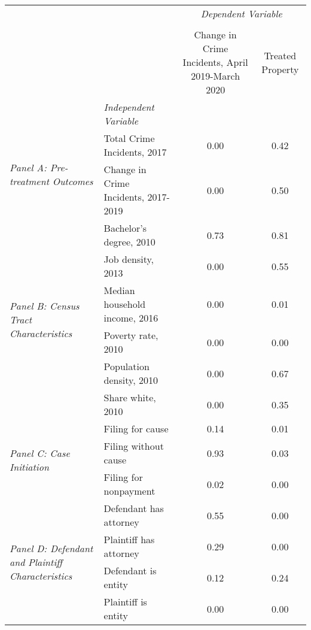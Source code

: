 \begin{tabular}{llcc}
\toprule
 &  & \multicolumn{2}{c}{\textit{Dependent Variable}} \\
\cline{3-4}
\\
 &  & Change in Crime Incidents, April 2019-March 2020 & Treated Property \\
 & \emph{Independent Variable} &  &  \\
\midrule
\multirow[c]{2}{3cm}{\textit{Panel A: Pre-treatment Outcomes}} & Total Crime Incidents, 2017 & 0.00 & 0.42 \\
 & Change in Crime Incidents, 2017-2019 & 0.00 & 0.50 \\
\cline{1-4}
\multirow[c]{6}{3cm}{\textit{Panel B: Census Tract Characteristics}} & Bachelor's degree, 2010 & 0.73 & 0.81 \\
 & Job density, 2013 & 0.00 & 0.55 \\
 & Median household income, 2016 & 0.00 & 0.01 \\
 & Poverty rate, 2010 & 0.00 & 0.00 \\
 & Population density, 2010 & 0.00 & 0.67 \\
 & Share white, 2010 & 0.00 & 0.35 \\
\cline{1-4}
\multirow[c]{3}{3cm}{\textit{Panel C: Case Initiation}} & Filing for cause & 0.14 & 0.01 \\
 & Filing without cause & 0.93 & 0.03 \\
 & Filing for nonpayment & 0.02 & 0.00 \\
\cline{1-4}
\multirow[c]{4}{3cm}{\textit{Panel D: Defendant and Plaintiff Characteristics}} & Defendant has attorney & 0.55 & 0.00 \\
 & Plaintiff has attorney & 0.29 & 0.00 \\
 & Defendant is entity & 0.12 & 0.24 \\
 & Plaintiff is entity & 0.00 & 0.00 \\
\cline{1-4}
\bottomrule
\end{tabular}
